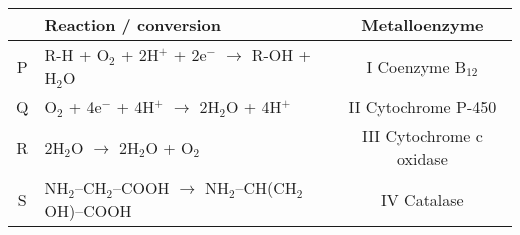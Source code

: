 \begin{tabular}{|c|l|c|}
\hline
 & Reaction / conversion & Metalloenzyme \\
\hline
P & R-H + O$_2$ + 2H$^+$ + 2e$^-$ $\rightarrow$ R-OH + H$_2$O & I Coenzyme B$_{12}$ \\
Q & O$_2$ + 4e$^-$ + 4H$^+$ $\rightarrow$ 2H$_2$O + 4H$^+$ & II Cytochrome P-450 \\
R & 2H$_2$O $\rightarrow$ 2H$_2$O + O$_2$ & III Cytochrome c oxidase \\
S & NH$_2$–CH$_2$–COOH $\rightarrow$ NH$_2$–CH(CH$_2$OH)–COOH & IV Catalase \\
\hline
\end{tabular}